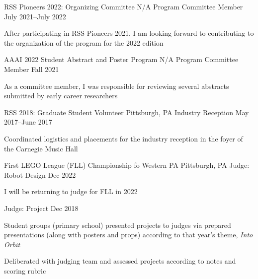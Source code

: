 
\begin{cventries}
  \cventry
  {RSS Pioneers 2022: Organizing Committee}
  {N/A}
  {Program Committee Member}
  {July 2021--July 2022}
  {
    \begin{cvitems}
    \item After participating in RSS Pioneers 2021, I am looking forward to
      contributing to the organization of the program for the 2022 edition
    \end{cvitems}
  }
  \cventry
  {AAAI 2022 Student Abstract and Poster Program}
  {N/A}
  {Program Committee Member}
  {Fall 2021}
  {
    \begin{cvitems}
    \item As a committee member, I was responsible for reviewing several
      abstracts submitted by early career researchers
    \end{cvitems}
  }
  \cventry
  {RSS 2018: Graduate Student Volunteer}
  {Pittsburgh, PA}
  {Industry Reception}
  {May 2017--June 2017}
  {
    \begin{cvitems}
    \item Coordinated logistics and placements for the industry reception
      in the foyer of the Carnegie Music Hall
    \end{cvitems}
  }
  \cventrytwo
  {First LEGO League (FLL) Championship fo Western PA}
  {Pittsburgh, PA}
  {Judge: Robot Design}
  {Dec 2022}
  {
    \begin{cvitems}
    \item I will be returning to judge for FLL in 2022
    \end{cvitems}
  }
  {Judge: Project}
  {
    Dec 2018
  }
  {
    \begin{cvitems}
    \item Student groups (primary school) presented projects to judges via
      prepared presentations (along with posters and props) according to that
      year's theme, \emph{Into Orbit}
    \item Deliberated with judging team and assessed projects according to
      notes and scoring rubric
    \end{cvitems}
  }
\end{cventries}

